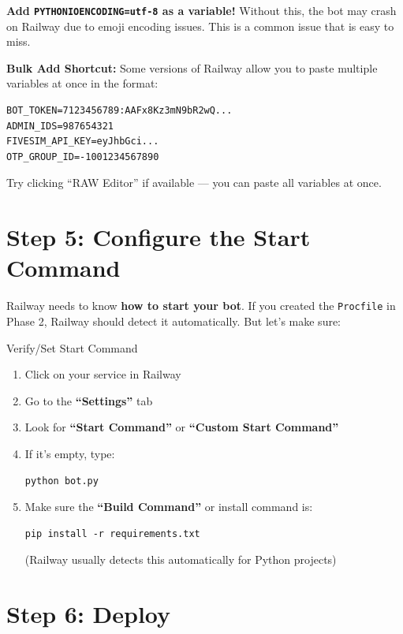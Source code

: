 \begin{importantbox}
\textbf{Add \texttt{PYTHONIOENCODING=utf-8} as a variable!} Without this, the bot may crash on Railway due to emoji encoding issues. This is a common issue that is easy to miss.
\end{importantbox}

\begin{tipbox}
\textbf{Bulk Add Shortcut:} Some versions of Railway allow you to paste multiple variables at once in the format:
\begin{lstlisting}[style=termstyle]
BOT_TOKEN=7123456789:AAFx8Kz3mN9bR2wQ...
ADMIN_IDS=987654321
FIVESIM_API_KEY=eyJhbGci...
OTP_GROUP_ID=-1001234567890
\end{lstlisting}
Try clicking ``RAW Editor'' if available --- you can paste all variables at once.
\end{tipbox}

\section{Step 5: Configure the Start Command}

Railway needs to know \textbf{how to start your bot}. If you created the \texttt{Procfile} in Phase 2, Railway should detect it automatically. But let's make sure:

\begin{stepbox}{Verify/Set Start Command}
\begin{enumerate}[leftmargin=1.5cm]
    \item Click on your service in Railway
    \item Go to the \textbf{``Settings''} tab
    \item Look for \textbf{``Start Command''} or \textbf{``Custom Start Command''}
    \item If it's empty, type:
    \begin{lstlisting}[style=termstyle]
python bot.py
    \end{lstlisting}
    \item Make sure the \textbf{``Build Command''} or install command is:
    \begin{lstlisting}[style=termstyle]
pip install -r requirements.txt
    \end{lstlisting}
    (Railway usually detects this automatically for Python projects)
\end{enumerate}
\end{stepbox}

\section{Step 6: Deploy}


